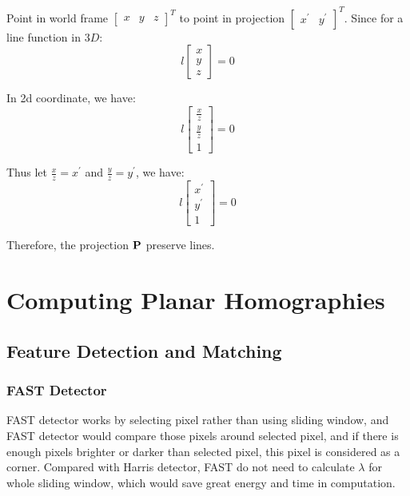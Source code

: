 \documentclass[11pt]{article} \usepackage{fullpage} \usepackage{graphicx} \usepackage{epstopdf} \usepackage{color} \usepackage{psfrag} \usepackage{pdfsync}\usepackage{indentfirst}\usepackage{subfigure}\usepackage{float}\usepackage[section]{placeins}
\begin{document}
Point in world frame $\left[ \begin{smallmatrix} x & y & z \end{smallmatrix} \right]^{T}$ to point in projection $\left[ \begin{smallmatrix} x^\prime & y^\prime \end{smallmatrix} \right]^{T}$. Since for a line function in $3D$: 
\begin{equation}
	l\begin{bmatrix}
		x \\ y \\ z
	\end{bmatrix} = 0
\end{equation}

In 2d coordinate, we have:
\begin{equation}
	l\begin{bmatrix}
		\frac{x}{z} \\ \frac{y}{z} \\ 1
	\end{bmatrix} = 0
\end{equation}

Thus let $\frac{x}{z} = x^\prime$ and $\frac{y}{z} = y^\prime$, we have:
\begin{equation}
	l\begin{bmatrix}
		x^\prime \\ y^\prime \\ 1
	\end{bmatrix} = 0
\end{equation}

Therefore, the projection $\bold{P}$ preserve lines.

\section{Computing Planar Homographies}
\setcounter{subsection}{0}
\subsection{Feature Detection and Matching}

\setcounter{subsubsection}{0}
\subsubsection{FAST Detector}

FAST detector works by selecting pixel rather than using sliding window, and FAST detector would compare those pixels around selected pixel, and if there is enough pixels brighter or darker than selected pixel, this pixel is considered as a corner. Compared with Harris detector, FAST do not need to calculate $\lambda$ for whole sliding window, which would save great energy and time in computation.
\end{document}
